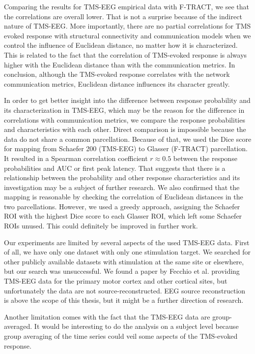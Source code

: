 Comparing the results for TMS-EEG empirical data with F-TRACT, we see that the correlations are overall lower. That is not a surprise because of the indirect nature of TMS-EEG. More importantly, there are no partial correlations for TMS evoked response with structural connectivity and communication models when we control the influence of Euclidean distance, no matter how it is characterized. This is related to the fact that the correlation of TMS-evoked response is always higher with the Euclidean distance than with the communication metrics. In conclusion, although the TMS-evoked response correlates with the network communication metrics, Euclidean distance influences its character greatly.

In order to get better insight into the difference between response probability and its characterization in TMS-EEG, which may be the reason for the difference in correlations with communication metrics, we compare the response probabilities and characteristics with each other. Direct comparison is impossible because the data do not share a common parcellation. Because of that, we used the Dice score for mapping from Schaefer 200 (TMS-EEG) to Glasser (F-TRACT) parcellation. It resulted in a Spearman correlation coefficient $r\approx0.5$ between the response probabilities and AUC or first peak latency. That suggests that there is a relationship between the probability and other response characteristics and its investigation may be a subject of further research. We also confirmed that the mapping is reasonable by checking the correlation of Euclidean distances in the two parcellations. However, we used a greedy approach, assigning the Schaefer ROI with the highest Dice score to each Glasser ROI, which left some Schaefer ROIs unused. This could definitely be improved in further work.

Our experiments are limited by several aspects of the used TMS-EEG data. First of all, we have only one dataset with only one stimulation target. We searched for other publicly available datasets with stimulation at the same site or elsewhere, but our search was unsuccessful. We found a paper by Fecchio et al. \cite{fecchio_spectral_2017} providing TMS-EEG data for the primary motor cortex and other cortical sites, but unfortunately the data are not source-reconstructed. EEG source reconstruction is above the scope of this thesis, but it might be a further direction of research.

Another limitation comes with the fact that the TMS-EEG data are group-averaged. It would be interesting to do the analysis on a subject level because group averaging of the time series could veil some aspects of the TMS-evoked response.

